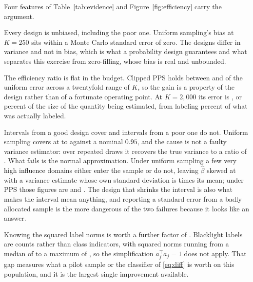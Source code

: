 \documentclass[11pt]{article}
\theoremstyle{plain}
\theoremstyle{remark}
\begin{document}
Four features of Table~\ref{tab:evidence} and Figure~\ref{fig:efficiency} carry the argument.

Every design is unbiased, including the poor one. Uniform sampling's bias at $K=250$ sits within a Monte Carlo standard error of zero. The designs differ in variance and not in bias, which is what a probability design guarantees and what separates this exercise from zero-filling, whose bias is real and unbounded.

The efficiency ratio is flat in the budget. Clipped PPS holds between \EffRatioLo{} and \EffRatioHi{} of the uniform error across a twentyfold range of $K$, so the gain is a property of the design rather than of a fortunate operating point. At $K=2{,}000$ its error is \RmseAtTwoThousand{}, or \RelErrAtTwoThousand{} percent of the size of the quantity being estimated, from labeling \BudgetShareAtTwoThousand{} percent of what was actually labeled.

Intervals from a good design cover and intervals from a poor one do not. Uniform sampling covers at \SrsCoverageLo{} to \SrsCoverageHi{} against a nominal $0.95$, and the cause is not a faulty variance estimator: over repeated draws it recovers the true variance to a ratio of \SrsVarRatio{}. What fails is the normal approximation. Under uniform sampling a few very high influence domains either enter the sample or do not, leaving $\widehat\beta$ skewed at \SrsSkew{} with a variance estimate whose own standard deviation is \SrsVarDispersion{} times its mean; under PPS those figures are \PpsSkew{} and \PpsVarDispersion{}. The design that shrinks the interval is also what makes the interval mean anything, and reporting a standard error from a badly allocated sample is the more dangerous of the two failures because it looks like an answer.

Knowing the squared label norms is worth a further factor of \OracleFactor{}. Blacklight labels are counts rather than class indicators, with squared norms running from a median of \NormMedian{} to a maximum of \NormMax{}, so the simplification $a_j^\top a_j=1$ does not apply. That gap measures what a pilot sample or the classifier of \eqref{eq:diff} is worth on this population, and it is the largest single improvement available.

\begin{table}[t]
\centering\small

\caption{Bias and variance as the Horvitz--Thompson weight is shrunk. The same items are labeled in every row and only the weight differs: at $\alpha=1$ it is $1/\pi_j$ and the estimator is unbiased, and at $\alpha=0$ every labeled item enters with weight one, which is what zero-filling the unlabeled amounts to. Bold marks the smallest RMSE in each block. Population as in Table~\ref{tab:evidence}; \FrontierReps{} replicates per row.}
\label{tab:frontier}
\end{table}
\end{document}
